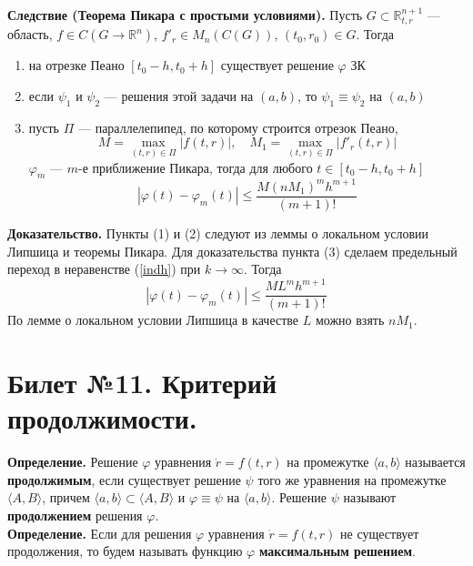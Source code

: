 \documentclass{article}
\begin{document}
\noindent \textbf{Следствие (Теорема Пикара с простыми условиями).} Пусть $G \subset \mathbb{R}_{t,r}^{n+1}$ --- область, $f \in C(G \to \mathbb{R}^n)$, $f'_r \in M_n(C(G))$, $(t_0, r_0) \in G$. Тогда
\begin{enumerate}
    \item на отрезке Пеано $[t_0 - h, t_0 + h]$ существует решение $\varphi$ ЗК
    \item если $\psi_1$ и $\psi_2$ --- решения этой задачи на $(a,b)$, то $\psi_1 \equiv \psi_2$ на $(a,b)$
    \item пусть $\Pi$ --- параллелепипед, по которому строится отрезок Пеано,
    \begin{equation*}
        M = \max_{(t,r) \in \Pi} |f(t,r)|, \quad M_1 = \max_{(t,r) \in \Pi} |f'_r(t,r)|
    \end{equation*}
    $\varphi_m$ --- $m$-е приближение Пикара, тогда для любого $t \in [t_0 - h, t_0 + h]$
    \begin{equation*}
        |\varphi(t) - \varphi_m(t)| \le \frac{M(nM_1)^mh^{m+1}}{(m+1)!}
    \end{equation*}
\end{enumerate}
\textbf{Доказательство.} Пункты (1) и (2) следуют из леммы о локальном условии Липшица и теоремы Пикара. Для доказательства пункта (3) сделаем предельный переход в неравенстве (\ref{indh}) при $k \to \infty$. Тогда
\begin{equation*}
    |\varphi(t) - \varphi_m(t)| \le \frac{ML^mh^{m+1}}{(m+1)!}
\end{equation*}
По лемме о локальном условии Липшица в качестве $L$ можно взять $nM_1$.

\section{Билет №11. Критерий продолжимости.}
\textbf{Определение.} Решение $\varphi$ уравнения $\dot{r} = f(t,r)$ на промежутке $\langle a,b \rangle$ называется \textbf{продолжимым}, если существует решение $\psi$ того же уравнения на промежутке $\langle A, B \rangle$, причем $\langle a,b \rangle \subset \langle A,B \rangle$ и $\varphi \equiv \psi$ на $\langle a,b \rangle$. Решение $\psi$ называют \textbf{продолжением} решения $\varphi$.\\

\noindent \textbf{Определение.} Если для решения $\varphi$ уравнения $\dot{r} = f(t,r)$ не существует продолжения, то будем называть функцию $\varphi$ \textbf{максимальным решением}.\\
\end{document}
